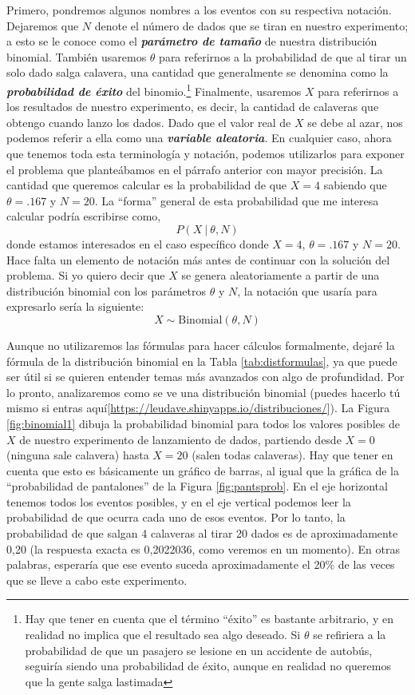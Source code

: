 \documentclass[spanish,]{book}
\let\rmarkdownfootnote\footnote%
\def\footnote{\protect\rmarkdownfootnote}
\begin{document}
Primero, pondremos algunos nombres a los eventos con su respectiva
notación. Dejaremos que \(N\) denote el número de dados que se tiran en
nuestro experimento; a esto se le conoce como el \textbf{\emph{parámetro
de tamaño}} de nuestra distribución binomial. También usaremos
\(\theta\) para referirnos a la probabilidad de que al tirar un solo
dado salga calavera, una cantidad que generalmente se denomina como la
\textbf{\emph{probabilidad de éxito}} del binomio.\footnote{Hay que
  tener en cuenta que el término ``éxito'' es bastante arbitrario, y en
  realidad no implica que el resultado sea algo deseado. Si \(\theta\)
  se refiriera a la probabilidad de que un pasajero se lesione en un
  accidente de autobús, seguiría siendo una probabilidad de éxito,
  aunque en realidad no queremos que la gente salga lastimada}
Finalmente, usaremos \(X\) para referirnos a los resultados de nuestro
experimento, es decir, la cantidad de calaveras que obtengo cuando lanzo
los dados. Dado que el valor real de \(X\) se debe al azar, nos podemos
referir a ella como una \textbf{\emph{variable aleatoria}}. En cualquier
caso, ahora que tenemos toda esta terminología y notación, podemos
utilizarlos para exponer el problema que planteábamos en el párrafo
anterior con mayor precisión. La cantidad que queremos calcular es la
probabilidad de que \(X = 4\) sabiendo que \(\theta = .167\) y \(N=20\).
La ``forma'' general de esta probabilidad que me interesa calcular
podría escribirse como, \[
  P(X \ | \ \theta, N)
\] donde estamos interesados en el caso específico donde \(X=4\),
\(\theta = .167\) y \(N=20\). Hace falta un elemento de notación más
antes de continuar con la solución del problema. Si yo quiero decir que
\(X\) se genera aleatoriamente a partir de una distribución binomial con
los parámetros \(\theta\) y \(N\), la notación que usaría para
expresarlo sería la siguiente: \[
  X \sim \mbox{Binomial}(\theta, N)
\]

Aunque no utilizaremos las fórmulas para hacer cálculos formalmente,
dejaré la fórmula de la distribución binomial en la Tabla
\ref{tab:distformulas}, ya que puede ser útil si se quieren entender
temas más avanzados con algo de profundidad. Por lo pronto, analizaremos
como se ve una distribución binomial (puedes hacerlo tú mismo si entras
aquí{[}\url{https://leudave.shinyapps.io/distribuciones/}{]}). La Figura
\ref{fig:binomial1} dibuja la probabilidad binomial para todos los
valores posibles de \(X\) de nuestro experimento de lanzamiento de
dados, partiendo desde \(X=0\) (ninguna sale calavera) hasta \(X=20\)
(salen todas calaveras). Hay que tener en cuenta que esto es básicamente
un gráfico de barras, al igual que la gráfica de la ``probabilidad de
pantalones'' de la Figura \ref{fig:pantsprob}. En el eje horizontal
tenemos todos los eventos posibles, y en el eje vertical podemos leer la
probabilidad de que ocurra cada uno de esos eventos. Por lo tanto, la
probabilidad de que salgan 4 calaveras al tirar 20 dados es de
aproximadamente 0,20 (la respuesta exacta es 0,2022036, como veremos en
un momento). En otras palabras, esperaría que ese evento suceda
aproximadamente el 20\% de las veces que se lleve a cabo este
experimento.
\end{document}
